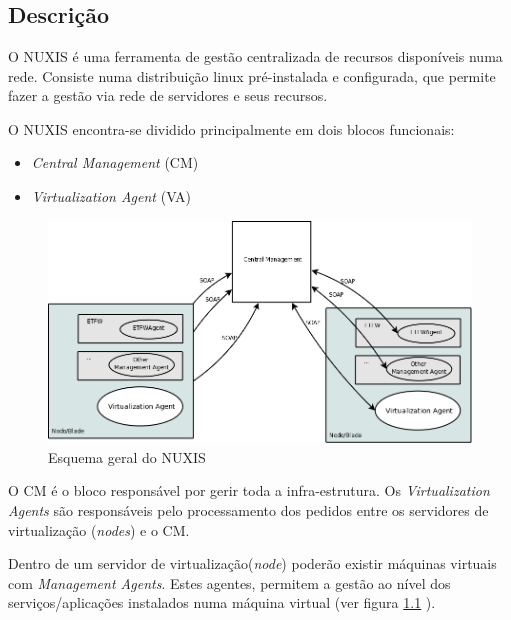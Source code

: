 \chapter{\textsf{\acronym}}
\section*{Descrição}
O NUXIS é uma ferramenta de gestão centralizada de recursos disponíveis numa rede. Consiste numa distribuição linux pré-instalada e configurada, que permite fazer a gestão via rede de servidores e seus recursos.

O NUXIS encontra-se dividido principalmente em dois blocos funcionais:

\begin{itemize}
	\item \emph{Central Management} (CM)
        \item \emph{Virtualization Agent} (VA)
\end{itemize}

\begin{figure}[H]
	\begin{center}
	\includegraphics[scale=0.35]{screenshots/etva_blocos.png}
	\caption{Esquema geral do NUXIS}
	\label{fig:etva_blocos}
	\end{center}
\end{figure}

O CM é o bloco responsável por gerir toda a infra-estrutura.
Os \emph{Virtualization Agents} são responsáveis pelo processamento dos pedidos entre os servidores de virtualização (\emph{nodes}) e o CM.

Dentro de um servidor de virtualização(\emph{node}) poderão existir máquinas virtuais com \emph{Management Agents}. Estes agentes, permitem a gestão ao nível dos serviços/aplicações instalados numa máquina virtual (ver figura \ref{fig:etva_blocos} ).

